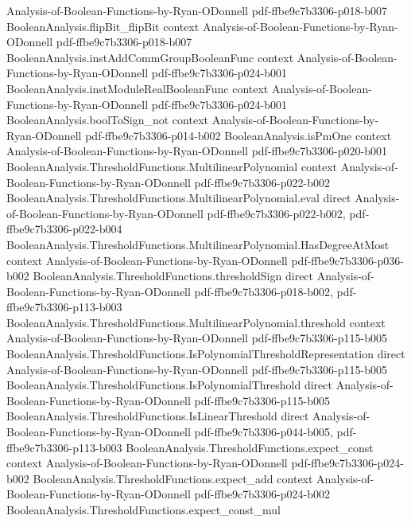 \begin{theorem}
  {Analysis-of-Boolean-Functions-by-Ryan-ODonnell}
  {pdf-ffbe9c7b3306-p018-b007}
\proofstep
  {BooleanAnalysis.flipBit_flipBit}
  {context}
  {Analysis-of-Boolean-Functions-by-Ryan-ODonnell}
  {pdf-ffbe9c7b3306-p018-b007}
\proofstep
  {BooleanAnalysis.instAddCommGroupBooleanFunc}
  {context}
  {Analysis-of-Boolean-Functions-by-Ryan-ODonnell}
  {pdf-ffbe9c7b3306-p024-b001}
\proofstep
  {BooleanAnalysis.instModuleRealBooleanFunc}
  {context}
  {Analysis-of-Boolean-Functions-by-Ryan-ODonnell}
  {pdf-ffbe9c7b3306-p024-b001}
\proofstep
  {BooleanAnalysis.boolToSign_not}
  {context}
  {Analysis-of-Boolean-Functions-by-Ryan-ODonnell}
  {pdf-ffbe9c7b3306-p014-b002}
\proofstep
  {BooleanAnalysis.isPmOne}
  {context}
  {Analysis-of-Boolean-Functions-by-Ryan-ODonnell}
  {pdf-ffbe9c7b3306-p020-b001}
\proofstep
  {BooleanAnalysis.ThresholdFunctions.MultilinearPolynomial}
  {context}
  {Analysis-of-Boolean-Functions-by-Ryan-ODonnell}
  {pdf-ffbe9c7b3306-p022-b002}
\proofstep
  {BooleanAnalysis.ThresholdFunctions.MultilinearPolynomial.eval}
  {direct}
  {Analysis-of-Boolean-Functions-by-Ryan-ODonnell}
  {pdf-ffbe9c7b3306-p022-b002,
    pdf-ffbe9c7b3306-p022-b004}
\proofstep
  {BooleanAnalysis.ThresholdFunctions.MultilinearPolynomial.HasDegreeAtMost}
  {context}
  {Analysis-of-Boolean-Functions-by-Ryan-ODonnell}
  {pdf-ffbe9c7b3306-p036-b002}
\proofstep
  {BooleanAnalysis.ThresholdFunctions.thresholdSign}
  {direct}
  {Analysis-of-Boolean-Functions-by-Ryan-ODonnell}
  {pdf-ffbe9c7b3306-p018-b002,
    pdf-ffbe9c7b3306-p113-b003}
\proofstep
  {BooleanAnalysis.ThresholdFunctions.MultilinearPolynomial.threshold}
  {context}
  {Analysis-of-Boolean-Functions-by-Ryan-ODonnell}
  {pdf-ffbe9c7b3306-p115-b005}
\proofstep
  {BooleanAnalysis.ThresholdFunctions.IsPolynomialThresholdRepresentation}
  {direct}
  {Analysis-of-Boolean-Functions-by-Ryan-ODonnell}
  {pdf-ffbe9c7b3306-p115-b005}
\proofstep
  {BooleanAnalysis.ThresholdFunctions.IsPolynomialThreshold}
  {direct}
  {Analysis-of-Boolean-Functions-by-Ryan-ODonnell}
  {pdf-ffbe9c7b3306-p115-b005}
\proofstep
  {BooleanAnalysis.ThresholdFunctions.IsLinearThreshold}
  {direct}
  {Analysis-of-Boolean-Functions-by-Ryan-ODonnell}
  {pdf-ffbe9c7b3306-p044-b005,
    pdf-ffbe9c7b3306-p113-b003}
\proofstep
  {BooleanAnalysis.ThresholdFunctions.expect_const}
  {context}
  {Analysis-of-Boolean-Functions-by-Ryan-ODonnell}
  {pdf-ffbe9c7b3306-p024-b002}
\proofstep
  {BooleanAnalysis.ThresholdFunctions.expect_add}
  {context}
  {Analysis-of-Boolean-Functions-by-Ryan-ODonnell}
  {pdf-ffbe9c7b3306-p024-b002}
\proofstep
  {BooleanAnalysis.ThresholdFunctions.expect_const_mul}

\end{theorem}
